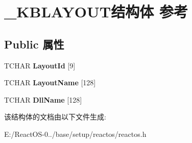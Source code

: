 \hypertarget{struct___k_b_l_a_y_o_u_t}{}\section{\+\_\+\+K\+B\+L\+A\+Y\+O\+U\+T结构体 参考}
\label{struct___k_b_l_a_y_o_u_t}
\subsection*{Public 属性}
\begin{DoxyCompactItemize}
\item 
\mbox{\label{struct___k_b_l_a_y_o_u_t_add22053487b79ad220abded94578dc9f}} 
T\+C\+H\+AR {\bfseries Layout\+Id} \mbox{[}9\mbox{]}
\item 
\mbox{\label{struct___k_b_l_a_y_o_u_t_ae02a80b1f377d5ec07f87d97eabfb57b}} 
T\+C\+H\+AR {\bfseries Layout\+Name} \mbox{[}128\mbox{]}
\item 
\mbox{\label{struct___k_b_l_a_y_o_u_t_a81920d74807c55d2750aa2e8caaef59b}} 
T\+C\+H\+AR {\bfseries Dll\+Name} \mbox{[}128\mbox{]}
\end{DoxyCompactItemize}


该结构体的文档由以下文件生成\+:\begin{DoxyCompactItemize}
\item 
E\+:/\+React\+O\+S-\/0../base/setup/reactos/reactos.\+h\end{DoxyCompactItemize}
